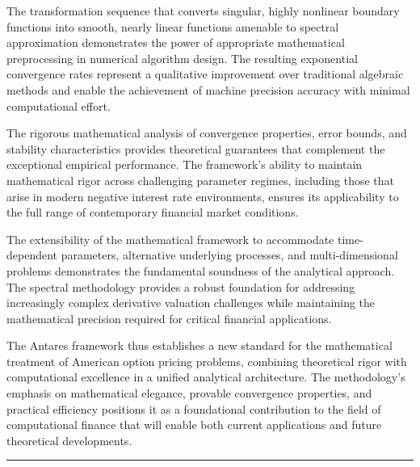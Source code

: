 \documentclass[
  american,
  11pt,
  11pt,
  letterpaper,
  onecolumn]{article}
\begin{document}
The transformation sequence that converts singular, highly nonlinear
boundary functions into smooth, nearly linear functions amenable to
spectral approximation demonstrates the power of appropriate
mathematical preprocessing in numerical algorithm design. The resulting
exponential convergence rates represent a qualitative improvement over
traditional algebraic methods and enable the achievement of machine
precision accuracy with minimal computational effort.

The rigorous mathematical analysis of convergence properties, error
bounds, and stability characteristics provides theoretical guarantees
that complement the exceptional empirical performance. The framework's
ability to maintain mathematical rigor across challenging parameter
regimes, including those that arise in modern negative interest rate
environments, ensures its applicability to the full range of
contemporary financial market conditions.

The extensibility of the mathematical framework to accommodate
time-dependent parameters, alternative underlying processes, and
multi-dimensional problems demonstrates the fundamental soundness of the
analytical approach. The spectral methodology provides a robust
foundation for addressing increasingly complex derivative valuation
challenges while maintaining the mathematical precision required for
critical financial applications.

The Antares framework thus establishes a new standard for the
mathematical treatment of American option pricing problems, combining
theoretical rigor with computational excellence in a unified analytical
architecture. The methodology's emphasis on mathematical elegance,
provable convergence properties, and practical efficiency positions it
as a foundational contribution to the field of computational finance
that will enable both current applications and future theoretical
developments.

\begin{center}\rule{0.5\linewidth}{0.5pt}\end{center}


\printbibliography
\end{document}
